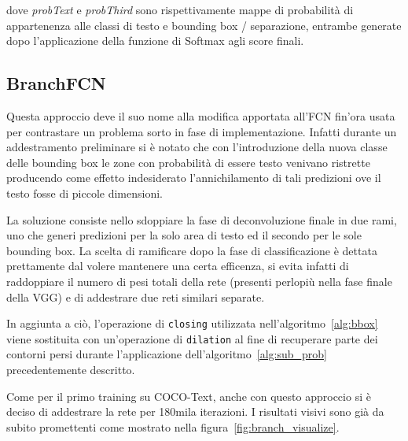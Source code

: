 \begin{algorithm}
\caption{}\label{alg:sub_prob}
\begin{algorithmic}
			\EndIf{}
		\EndFor{}
	\EndFor{}
\end{algorithmic}
\end{algorithm}

dove \textit{probText} e \textit{probThird} sono rispettivamente mappe di probabilità di appartenenza alle classi di testo e bounding box / separazione, entrambe generate dopo l'applicazione della funzione di Softmax agli score finali.


\subsection{BranchFCN}
\label{subsec:train_branch}
Questa approccio deve il suo nome alla modifica apportata all'FCN fin'ora usata per contrastare un problema sorto in fase di implementazione. Infatti durante un addestramento preliminare si è notato che con l'introduzione della nuova classe delle bounding box le zone con probabilità di essere testo venivano ristrette producendo come effetto indesiderato l'annichilamento di tali predizioni ove il testo fosse di piccole dimensioni.\par
La soluzione consiste nello sdoppiare la fase di deconvoluzione finale in due rami, uno che generi predizioni per la solo area di testo ed il secondo per le sole bounding box. La scelta di ramificare dopo la fase di classificazione è dettata prettamente dal volere mantenere una certa efficenza, si evita infatti di raddoppiare il numero di pesi totali della rete (presenti perlopiù nella fase finale della VGG) e di addestrare due reti similari separate.\par
In aggiunta a ciò, l'operazione di \texttt{closing} utilizzata nell'algoritmo~\ref{alg:bbox} viene sostituita con un'operazione di \texttt{dilation} al fine di recuperare parte dei contorni persi durante l'applicazione dell'algoritmo~\ref{alg:sub_prob} precedentemente descritto.\par 
Come per il primo training su COCO-Text, anche con questo approccio si è deciso di addestrare la rete per 180mila iterazioni. I risultati visivi sono già da subito promettenti come mostrato nella figura~\ref{fig:branch_visualize}.

